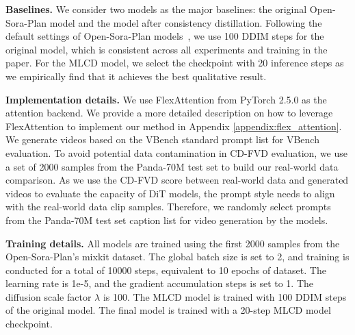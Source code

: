 \textbf{Baselines.} We consider two models as the major baselines: the original Open-Sora-Plan model and the model after consistency distillation. Following the default settings of Open-Sora-Plan models~\cite{pku_yuan_lab_and_tuzhan_ai_etc_2024_10948109}, we use 100 DDIM steps for the original model, which is consistent across all experiments and training in the paper. For the MLCD model, we select the checkpoint with 20 inference steps as we empirically find that it achieves the best qualitative result.


\textbf{Implementation details.} %
We use FlexAttention from PyTorch 2.5.0 \citep{pytorch} as the attention backend. We provide a more detailed description on how to leverage FlexAttention to implement our method in Appendix \ref{appendix:flex_attention}. We generate videos based on the VBench standard prompt list for VBench evaluation. To avoid potential data contamination in CD-FVD evaluation, we use a set of 2000 samples from the Panda-70M \citep{chen2024panda70m} test set to build our real-world data comparison. As we use the CD-FVD score between real-world data and generated videos to evaluate the capacity of DiT models, the prompt style needs to align with the real-world data clip samples. Therefore, we randomly select prompts from the Panda-70M test set caption list for video generation by the models.

\textbf{Training details.} All models are trained using the first 2000 samples from the Open-Sora-Plan's mixkit dataset.%
The global batch size is set to 2, and training is conducted for a total of 10000 steps, equivalent to 10 epochs of dataset. The learning rate is 1e-5, and the gradient accumulation steps is set to 1. The diffusion scale factor $\lambda$ is 100. The MLCD model is trained with 100 DDIM steps of the original model. The final model is trained with a 20-step MLCD model checkpoint.

